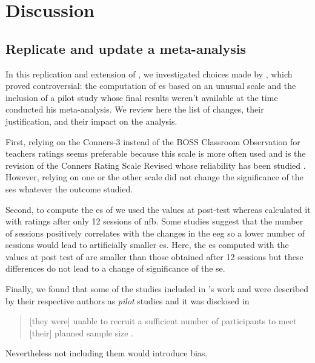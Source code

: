 


\section{Discussion}

\subsection{Replicate and update a meta-analysis}

In this replication and extension of \citet{Cortese2016}, we investigated choices made by \citeauthor{Cortese2016}, 
which proved controversial: the computation of \gls{es} based on an unusual scale \citep{Steiner2014} and the inclusion 
of a pilot study \citep{Arnold2014} whose final results weren't available at the time \citeauthor{Cortese2016} 
conducted his meta-analysis. We review here the list of changes, their justification, and their impact on the analysis.
 
First, relying on the Conners-3 \citep{Conners2008} instead of the BOSS Classroom Observation \citep{Shapiro2010} 
for teachers ratings seems preferable because this scale is more often used \citep{Christiansen2014, 
Bluschke2016} and is the revision of the Conners Rating Scale Revised \citep{Conners1998} whose reliability has been studied 
\citep{Collett2003}. However, relying on one or the other scale did not 
change the significance of the s\gls{es} whatever the outcome studied.

Second, to compute the \gls{es} of \citet{Arnold2014} we used the values at post-test
whereas \citeauthor{Cortese2016} calculated it with ratings 
after only 12 sessions of \gls{nfb}. Some studies suggest that the number of sessions positively 
correlates with the changes in the \gls{eeg} \citep{Vernon2004} so a lower number of sessions would lead to 
artificially smaller \gls{es}. Here, the \gls{es} computed with the values at post test of \citet{Arnold2014} 
are smaller than those obtained after 12 sessions but these differences do not lead to a change of significance of the \gls{se}. 

Finally, we found that some of the studies included in \citeauthor{Cortese2016}'s work 
\citep{Arnold2014} and \citep{Steiner2011} were described by their respective authors as \emph{pilot} 
studies and it was disclosed in \citet{VanDongen2013, vanDongenBoomsma2015} \begin{quote} [they were] unable to recruit a sufficient 
number of participants to meet [their] planned sample size .\end{quote} Nevertheless not including them would introduce bias.

